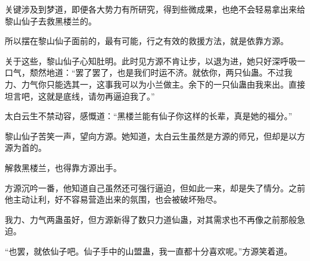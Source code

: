 \begin{this_body}
关键涉及到梦道，即便各大势力有所研究，得到些微成果，也绝不会轻易拿出来给黎山仙子去救黑楼兰的。

所以摆在黎山仙子面前的，最有可能，行之有效的救援方法，就是依靠方源。

关于这些，黎山仙子心知肚明。此时见方源不肯让步，以退为进，她只好深呼吸一口气，颓然地道：“罢了罢了，也是我们时运不济。就依你，两只仙蛊。不过我力、力气你只能选其一，这事我可以为小兰做主。余下的一只仙蛊由我来出。直接坦言吧，这就是底线，请勿再逼迫我了。”

太白云生不禁动容，感慨道：“黑楼兰能有仙子你这样的长辈，真是她的福分。”

黎山仙子苦笑一声，望向方源。她知道，太白云生虽然是方源的师兄，但却是以方源为首的。

解救黑楼兰，也得靠方源出手。

方源沉吟一番，他知道自己虽然还可强行逼迫，但如此一来，却是失了情分。之前他主动让利，好不容易营造出来的氛围，也会被破坏殆尽。

我力、力气两蛊虽好，但方源新得了数只力道仙蛊，对其需求也不再像之前那般急迫。

“也罢，就依仙子吧。仙子手中的山盟蛊，我一直都十分喜欢呢。”方源笑着道。

\end{this_body}

